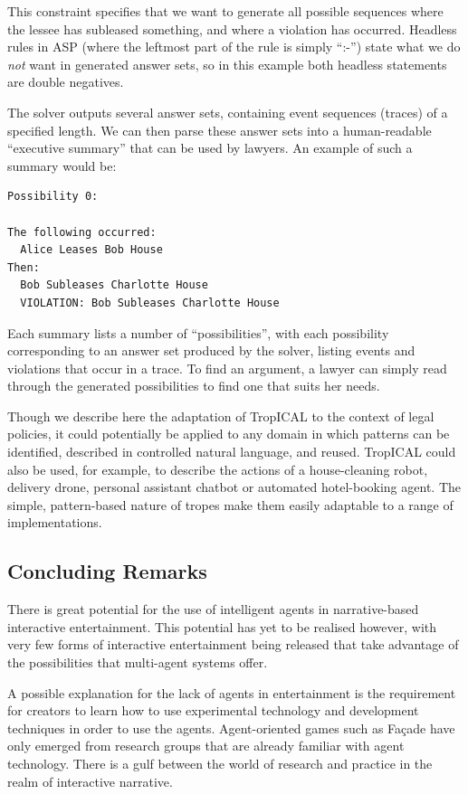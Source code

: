 \documentclass[11pt]{report}
\begin{document}
This constraint specifies that we want to generate all possible sequences where
the lessee has subleased something, and where a violation has occurred. Headless
rules in ASP (where the leftmost part of the rule is simply ``:-'') state what we
do \emph{not} want in generated answer sets, so in this example both headless
statements are double negatives.

The solver outputs several answer sets, containing event sequences (traces) of a
specified length. We can then parse these answer sets into a human-readable
``executive summary'' that can be used by lawyers. An example of such a summary
would be:

\begin{lstlisting}
Possibility 0:

The following occurred:
  Alice Leases Bob House
Then:
  Bob Subleases Charlotte House
  VIOLATION: Bob Subleases Charlotte House
\end{lstlisting}

Each summary lists a number of ``possibilities'', with each possibility
corresponding to an answer set produced by the solver, listing events and violations that occur
in a trace. To find an argument, a lawyer can simply read through the generated
possibilities to find one that suits her needs.

Though we describe here the adaptation of TropICAL to the context of legal
policies, it could potentially be applied to any domain in which patterns can be
identified, described in controlled natural language, and reused. TropICAL
could also be used, for example, to describe the actions of a house-cleaning robot,
delivery drone, personal assistant chatbot or automated hotel-booking agent. The
simple, pattern-based nature of tropes make them easily adaptable to a range of implementations.

\subsection{Concluding Remarks}
There is great potential for the use of intelligent agents in narrative-based
interactive entertainment. This potential has yet to be realised however, with
very few forms of interactive entertainment being released that take advantage
of the possibilities that multi-agent systems offer.

A possible explanation for the lack of agents in entertainment is the
requirement for creators to learn how to use experimental technology and
development techniques in order to use the agents. Agent-oriented games such as
Fa\c{c}ade have only emerged from research groups that are already familiar with
agent technology. There is a gulf between the world of research and practice in
the realm of interactive narrative.
\end{document}
